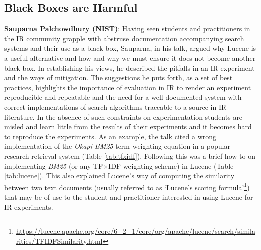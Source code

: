 \subsection*{Black Boxes are Harmful}

{\bf Sauparna Palchowdhury (NIST)}: Having seen students and
practitioners in the IR community grapple with abstruse documentation
accompanying search systems and their use as a black box, Sauparna, in
his talk, argued why Lucene is a useful alternative and how and why we
must ensure it does not become another black box. In establishing his
views, he described the pitfalls in an IR experiment and the ways of
mitigation. The suggestions he puts forth, as a set of best practices,
highlights the importance of evaluation in IR to render an experiment
reproducible and repeatable and the need for a well-documented system
with correct implementations of search algorithms traceable to a
source in IR literature. In the absence of such constraints on
experimentation students are misled and learn little from the results
of their experiments and it becomes hard to reproduce the
experiments. As an example, the talk cited a wrong implementation of
the \emph{Okapi BM25} term-weighting equation in a popular research
retrieval system (Table \ref{tab:tfxidf}). Following this was a brief
how-to on implementing \emph{BM25} (or any TF$\times$IDF weighting
scheme) in Lucene (Table \ref{tab:lucene}). This also explained
Lucene's way of computing the similarity between two text documents
(usually referred to as `Lucene's scoring
formula'\footnote{\url{https://lucene.apache.org/core/6_2_1/core/org/apache/lucene/search/similarities/TFIDFSimilarity.html}})
that may be of use to the student and practitioner interested in using
Lucene for IR experiments.

